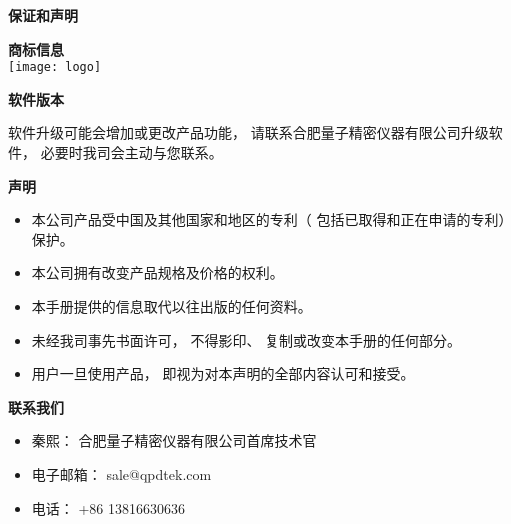 \newpage
\pagestyle{fancy}
\renewcommand{\headrulewidth}{2.4pt}
\renewcommand{\footrulewidth}{2.4pt}
\chead{}
\cfoot{}
\fancyfoot[RO,LE]{\xiaosi\textbf{\thepage}}



\xiaoer \textbf{保证和声明}
\vspace{0.7cm}

\xiaosi \textbf{商标信息}\\
\hspace*{0.8cm}
\hspace{-10.0cm}\texttt{[image: logo]}

\vspace{0.8cm}
\xiaosi\textbf{软件版本}
\vspace{0.4cm}

\song 软件升级可能会增加或更改产品功能， 请联系合肥量子精密仪器有限公司升级软件， 必要时我司会主动与您联系。

\vspace{0.8cm}
\xiaosi\textbf{声明}
\song
\begin{itemize}
 \item 本公司产品受中国及其他国家和地区的专利（ 包括已取得和正在申请的专利）保护。
 \item 本公司拥有改变产品规格及价格的权利。
 \item 本手册提供的信息取代以往出版的任何资料。
 \item 未经我司事先书面许可， 不得影印、 复制或改变本手册的任何部分。
 \item 用户一旦使用产品， 即视为对本声明的全部内容认可和接受。
\end{itemize}

\vspace{0.6cm}

\xiaosi\textbf{联系我们}
\song
\begin{itemize}
 \item 秦熙： 合肥量子精密仪器有限公司首席技术官
 \item 电子邮箱： sale@qpdtek.com
 \item 电话： +86 13816630636
\end{itemize}


